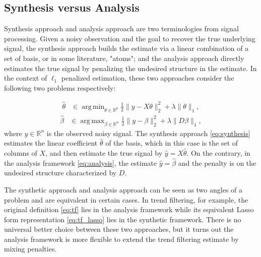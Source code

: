 \documentclass[a4paper]{article}
\DeclareMathOperator*{\argmin}{arg\,min}
\DeclareMathOperator*{\argmax}{arg\,max}
\newcommand{\RR}{\mathbb{R}}
\begin{document}
\subsection{Synthesis versus Analysis}
\label{subsec:syn_vs_ana}
Synthesis approach and analysis approach are two terminologies from signal processing. Given a noisy observation and the goal to recover the true underlying signal, the synthesis approach builds the estimate via a linear combination of a set of basis, or in some literature, "atoms"; and the analysis approach directly estimates the true signal by penalizing the undesired structure in the estimate. In the context of $\ell_1$ penalized estimation, these two approaches consider the following two problems respectively:

\begin{align}
\hat{\theta} &\in \argmin_{\theta\in\RR^p}\frac{1}{2}\|y-X\theta\|_2^2 + \lambda\|\theta\|_1,
\label{eq:synthesis}
\end{align}
\begin{align}
\hat{\beta} &\in \argmax_{\beta\in\RR^n}\frac{1}{2}\|y-\beta\|_2^2 + \lambda\|D\beta\|_1,
\label{eq:analysis}
\end{align}
where $y\in\RR^n$ is the observed noisy signal. The synthesis approach \eqref{eq:synthesis} estimates the linear coefficient $\hat{\theta}$ of the basis, which in this case is the set of columns of $X$, and then estimate the true signal by $\hat{y} = X\hat{\theta}$. On the contrary, in the analysis framework \eqref{eq:analysis}, the estimate $\hat{y} = \hat{\beta}$ and the penalty is on the undesired structure characterized by $D$.

The synthetic approach and analysis approach can be seen as two angles of a problem and are equivalent in certain cases. In trend filtering, for example, the original definition \eqref{eq:tf} lies in the analysis framework while its equivalent Lasso form representation \eqref{eq:tf_lasso} lies in the synthetic framework. There is no universal better choice between these two approaches, but it turns out the analysis framework is more flexible to extend the trend filtering estimate by mixing penalties.
\end{document}

